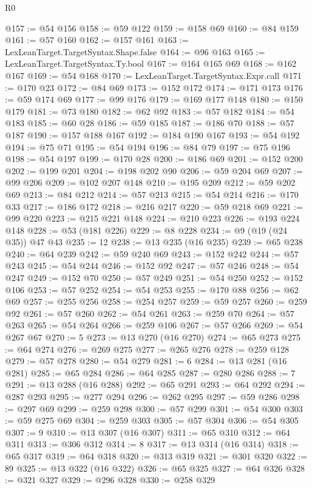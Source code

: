 \begin{lexlean}{R0}
\begin{coremodule}
@157 := @54 @156
@158 := @59 @122
@159 := @158 @69
@160 := @84 @159
@161 := @57 @160
@162 := @157 @161
@163 := LexLeanTarget.TargetSyntax.Shape.false
@164 := @96 @163
@165 := LexLeanTarget.TargetSyntax.Ty.bool
@167 := @164 @165 @69
@168 := @162 @167
@169 := @54 @168
@170 := LexLeanTarget.TargetSyntax.Expr.call
@171 := @170 @23
@172 := @84 @69
@173 := @152 @172
@174 := @171 @173
@176 := @59 @174 @69
@177 := @99 @176
@179 := @169 @177 @148
@180 := @150 @179
@181 := @73 @180
@182 := @62 @92
@183 := @57 @182
@184 := @54 @183
@185 := @60 @28
@186 := @59 @185
@187 := @186 @70
@188 := @57 @187
@190 := @157 @188 @167
@192 := @184 @190 @167
@193 := @54 @192
@194 := @75 @71
@195 := @54 @194
@196 := @84 @79
@197 := @75 @196
@198 := @54 @197
@199 := @170 @28
@200 := @186 @69
@201 := @152 @200
@202 := @199 @201
@204 := @198 @202 @90
@206 := @59 @204 @69
@207 := @99 @206
@209 := @102 @207 @148
@210 := @195 @209
@212 := @59 @202 @69
@213 := @84 @212
@214 := @57 @213
@215 := @54 @214
@216 := @170 @33
@217 := @186 @172
@218 := @216 @217
@220 := @59 @218 @69
@221 := @99 @220
@223 := @215 @221 @148
@224 := @210 @223
@226 := @193 @224 @148
@228 := @53 (@181 @226)
@229 := @8 @228
@234 := @9 (@19 (@24 @35)) @47 @43
@235 := 12
@238 := @13 @235 (@16 @235)
@239 := @65 @238
@240 := @64 @239
@242 := @59 @240 @69
@243 := @152 @242
@244 := @57 @243
@245 := @54 @244
@246 := @152 @92
@247 := @57 @246
@248 := @54 @247
@249 := @152 @70
@250 := @57 @249
@251 := @54 @250
@252 := @152 @106
@253 := @57 @252
@254 := @54 @253
@255 := @170 @88
@256 := @62 @69
@257 := @255 @256
@258 := @254 @257
@259 := @59 @257
@260 := @259 @92
@261 := @57 @260
@262 := @54 @261
@263 := @259 @70
@264 := @57 @263
@265 := @54 @264
@266 := @259 @106
@267 := @57 @266
@269 := @54 @267 @67
@270 := 5
@273 := @13 @270 (@16 @270)
@274 := @65 @273
@275 := @64 @274
@276 := @269 @275
@277 := @265 @276
@278 := @259 @128
@279 := @57 @278
@280 := @54 @279
@281 := 6
@284 := @13 @281 (@16 @281)
@285 := @65 @284
@286 := @64 @285
@287 := @280 @286
@288 := 7
@291 := @13 @288 (@16 @288)
@292 := @65 @291
@293 := @64 @292
@294 := @287 @293
@295 := @277 @294
@296 := @262 @295
@297 := @59 @286
@298 := @297 @69
@299 := @259 @298
@300 := @57 @299
@301 := @54 @300
@303 := @59 @275 @69
@304 := @259 @303
@305 := @57 @304
@306 := @54 @305
@307 := 9
@310 := @13 @307 (@16 @307)
@311 := @65 @310
@312 := @64 @311
@313 := @306 @312
@314 := 8
@317 := @13 @314 (@16 @314)
@318 := @65 @317
@319 := @64 @318
@320 := @313 @319
@321 := @301 @320
@322 := 89
@325 := @13 @322 (@16 @322)
@326 := @65 @325
@327 := @64 @326
@328 := @321 @327
@329 := @296 @328
@330 := @258 @329

\end{coremodule}
\end{lexlean}
